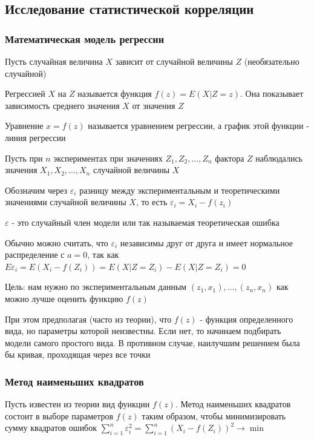\documentclass[12pt]{article}
\begin{document}
\subsection{Исследование статистической корреляции}

\subsubsection{Математическая модель регрессии}

\hypertarget{regression}{}

Пусть случайная величина $X$ зависит от случайной величины $Z$ (необязательно случайной)

\Def Регрессией $X$ на $Z$ называется функция $f(z) = E(X|Z = z)$. 
Она показывает зависимость среднего значения $X$ от значения $Z$

Уравнение $x = f(z)$ называется уравнением регрессии, а график этой функции - линия регрессии

Пусть при $n$ экспериментах при значениях $Z_1, Z_2, \dots, Z_n$ фактора $Z$ наблюдались значения
$X_1, X_2, \dots, X_n$ случайной величины $X$

Обозначим через $\varepsilon_i$ разницу между экспериментальным и теоретическими значениями случайной величины $X$,
то есть $\varepsilon_i = X_i - f(z_i)$

$\varepsilon$ - это случайный член модели или так называемая теоретическая ошибка

\Nota Обычно можно считать, что $\varepsilon_i$ независимы друг от друга и имеет нормальное распределение с $a = 0$,
так как $E\varepsilon_i = E(X_i - f(Z_i)) = E(X | Z = Z_i) - E(X | Z = Z_i) = 0$

Цель: нам нужно по экспериментальным данным $(z_1, x_1), \dots, (z_n, x_n)$ как можно лучше оценить функцию $f(z)$

\Notas При этом предполагая (часто из теории), что $f(z)$ - функция определенного вида, но параметры которой неизвестны.
Если нет, то начинаем подбирать модели самого простого вида. В противном случае, наилучшим решением была бы кривая, 
проходящая через все точки 

\subsubsection{Метод наименьших квадратов}

\hypertarget{method_of_least_squares}{}

Пусть известен из теории вид функции $f(z)$. Метод наименьших квадратов состоит в выборе параметров $f(z)$ таким образом,
чтобы минимизировать сумму квадратов ошибок $\sum_{i = 1}^n \varepsilon_i^2 = \sum_{i = 1}^n (X_i - f(Z_i))^2 \rightarrow \min$
\end{document}
